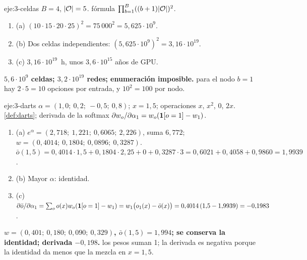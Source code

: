 \begin{solucion}{eje:3-celdas}
\datos $B=4$, $\lvert\mathcal{O}\rvert=5$.
\planteamiento fórmula $\prod_{b=1}^{B}((b+1)\lvert\mathcal{O}\rvert)^{2}$.
\pasos
\begin{enumerate}[label=\arabic*.]
  \item (a) $(10\cdot15\cdot20\cdot25)^{2}=75\,000^{2}=5{,}625\cdot10^{9}$.
  \item (b) Dos celdas independientes: $(5{,}625\cdot10^{9})^{2}=3{,}16\cdot10^{19}$.
  \item (c) $3{,}16\cdot10^{19}$~h, unos $3{,}6\cdot10^{15}$ años de GPU.
\end{enumerate}
\resultado \textbf{$5{,}6\cdot10^{9}$ celdas; $3{,}2\cdot10^{19}$ redes; enumeración imposible.}
\comprobacion para el nodo $b=1$ hay $2\cdot5=10$ opciones por entrada, y $10^{2}=100$ por nodo.
\end{solucion}

\begin{solucion}{eje:3-darts}
\datos $\alpha=(1{,}0;\ 0{,}2;\ -0{,}5;\ 0{,}8)$; $x=1{,}5$; operaciones $x$, $x^{2}$, $0$, $2x$.
\planteamiento \cref{def:darts}; derivada de la softmax $\partial w_o/\partial\alpha_1=w_o(\mathbf{1}[o=1]-w_1)$.
\pasos
\begin{enumerate}[label=\arabic*.]
  \item (a) $e^{\alpha}=(2{,}718;\ 1{,}221;\ 0{,}6065;\ 2{,}226)$, suma $6{,}772$; $w=(0{,}4014;\ 0{,}1804;\ 0{,}0896;\ 0{,}3287)$. $\bar o(1{,}5)=0{,}4014\cdot1{,}5+0{,}1804\cdot2{,}25+0+0{,}3287\cdot3=0{,}6021+0{,}4058+0{,}9860=1{,}9939$.
  \item (b) Mayor $\alpha$: identidad.
  \item (c) $\partial\bar o/\partial\alpha_1=\sum_o o(x)w_o(\mathbf{1}[o=1]-w_1)=w_1\bigl(o_1(x)-\bar o(x)\bigr)=0{,}4014\,(1{,}5-1{,}9939)=-0{,}1983$.
\end{enumerate}
\resultado \textbf{$w=(0{,}401;\ 0{,}180;\ 0{,}090;\ 0{,}329)$, $\bar o(1{,}5)=1{,}994$; se conserva la identidad; derivada $-0{,}198$.}
\comprobacion los pesos suman 1; la derivada es negativa porque la identidad da menos que la mezcla en $x=1{,}5$.
\end{solucion}

